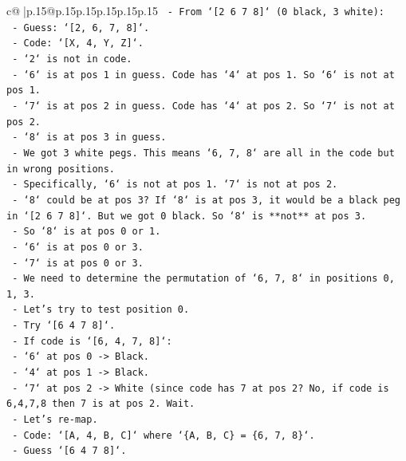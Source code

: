 \documentclass{article}
\begin{document}
{\begin{supertabular}{c@{$\;$}|p{.15\linewidth}@{}p{.15\linewidth}p{.15\linewidth}p{.15\linewidth}p{.15\linewidth}p{.15\linewidth}}
{{{\texttt{        {-} From `{[}2 6 7 8{]}` (0 black, 3 white):} \\
\texttt{            {-} Guess: `{[}2, 6, 7, 8{]}`.} \\
\texttt{            {-} Code: `{[}X, 4, Y, Z{]}`.} \\
\texttt{            {-} `2` is not in code.} \\
\texttt{            {-} `6` is at pos 1 in guess. Code has `4` at pos 1. So `6` is not at pos 1.} \\
\texttt{            {-} `7` is at pos 2 in guess. Code has `4` at pos 2. So `7` is not at pos 2.} \\
\texttt{            {-} `8` is at pos 3 in guess.} \\
\texttt{            {-} We got 3 white pegs. This means `6, 7, 8` are all in the code but in wrong positions.} \\
\texttt{            {-} Specifically, `6` is not at pos 1. `7` is not at pos 2.} \\
\texttt{            {-} `8` could be at pos 3? If `8` is at pos 3, it would be a black peg in `{[}2 6 7 8{]}`. But we got 0 black. So `8` is **not** at pos 3.} \\
\texttt{            {-} So `8` is at pos 0 or 1.} \\
\texttt{            {-} `6` is at pos 0 or 3.} \\
\texttt{            {-} `7` is at pos 0 or 3.} \\
\texttt{            {-} We need to determine the permutation of `6, 7, 8` in positions 0, 1, 3.} \\
\texttt{            {-} Let's try to test position 0.} \\
\texttt{            {-} Try `{[}6 4 7 8{]}`.} \\
\texttt{                {-} If code is `{[}6, 4, 7, 8{]}`:} \\
\texttt{                    {-} `6` at pos 0 {-}> Black.} \\
\texttt{                    {-} `4` at pos 1 {-}> Black.} \\
\texttt{                    {-} `7` at pos 2 {-}> White (since code has 7 at pos 2? No, if code is 6,4,7,8 then 7 is at pos 2. Wait.} \\
\texttt{                    {-} Let's re{-}map.} \\
\texttt{                    {-} Code: `{[}A, 4, B, C{]}` where `\{A, B, C\} = \{6, 7, 8\}`.} \\
\texttt{                    {-} Guess `{[}6 4 7 8{]}`.} \\
}}}
\end{supertabular}}
\end{document}
